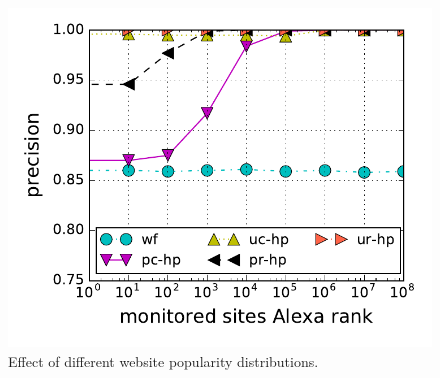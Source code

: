 \begin{figure}[t]
\centering
\includegraphics[width=0.75\linewidth]{figures/wfdns/dist/1kx100+100k}
\caption{Effect of different website popularity distributions.}
    \label{fig:wfdns:var:dist}
\end{figure}


